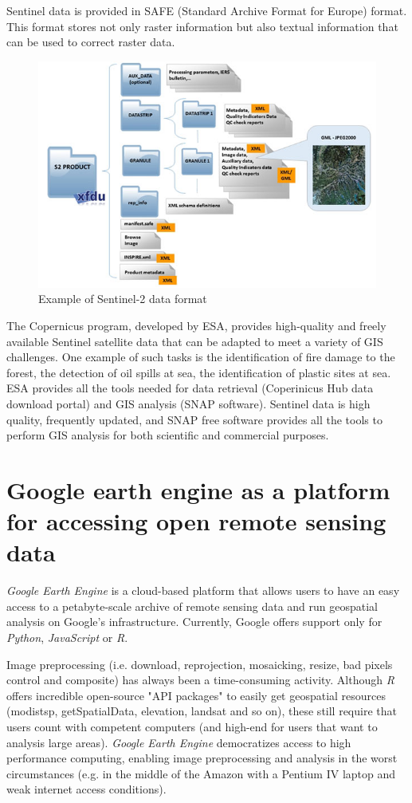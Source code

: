 	Sentinel data is provided in SAFE (Standard Archive Format for Europe) format. This format stores not only raster information but also textual information that can be used to correct raster data.

\begin{figure}[H]
	\centering
	\includegraphics[width=0.8\linewidth]{images/sentinel-2_data_formats.jpg}
	\caption{Example of Sentinel-2 data format}
	\label{fig:sentinel-2_format}
\end{figure}

	The Copernicus program, developed by ESA, provides high-quality and freely available Sentinel satellite data that can be adapted to meet a variety of GIS challenges. One example of such tasks is the identification of fire damage to the forest, the detection of oil spills at sea, the identification of plastic sites at sea. ESA provides all the tools needed for data retrieval (Coperinicus Hub data download portal) and GIS analysis (SNAP software). Sentinel data is high quality, frequently updated, and SNAP free software provides all the tools to perform GIS analysis for both scientific and commercial purposes.

\section{Google earth engine as a platform for accessing open remote sensing data}
	\textit{Google Earth Engine} is a cloud-based platform that allows users to have an easy access to a petabyte-scale archive of remote sensing data and run geospatial analysis on Google’s infrastructure. Currently, Google offers support only for \textit{Python}, \textit{JavaScript} or \textit{R}.
	
	Image preprocessing (i.e. download, reprojection, mosaicking, resize, bad pixels control and composite) has always been a time-consuming activity. Although \textit{R} offers incredible open-source "API packages" to easily get geospatial resources (modistsp, getSpatialData, elevation, landsat and so on), these still require that users count with competent computers (and high-end for users that want to analysis large areas). \textit{Google Earth Engine} democratizes access to high performance computing, enabling image preprocessing and analysis in the worst circumstances (e.g. in the middle of the Amazon with a Pentium IV laptop and weak internet access conditions).
	
